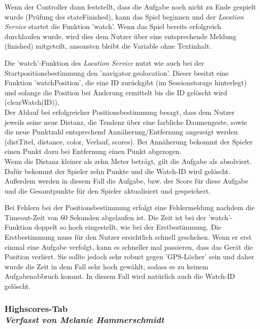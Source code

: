 Wenn der Controller dann feststellt, dass die Aufgabe noch nicht zu Ende gespielt wurde (Prüfung des stateFinished), kann das Spiel beginnen und der \emph{Location Service} startet die Funktion 'watch'. Wenn das Spiel bereits erfolgreich durchlaufen wurde, wird dies dem Nutzer über eine entsprechende Meldung (finished) mitgeteilt, ansonsten bleibt die Variable ohne Textinhalt.


Die 'watch'-Funktion des \emph{Location Service} nutzt wie auch bei der Startpositionsbestimmung den 'navigator.geolocation'. Dieser besitzt eine Funktion 'watchPosition', die eine ID zurückgibt (im Sessionstorage hinterlegt) und solange die Position bei Änderung ermittelt bis die ID gelöscht wird (clearWatch(ID)).
\\
Der Ablauf bei erfolgreicher Positionsbestimmung besagt, dass dem Nutzer jeweils seine neue Distanz, die Tendenz über eine farbliche Daumengeste, sowie die neue Punktzahl entsprechend Annäherung/Entfernung angezeigt werden (distTitel, distance, color, Verlauf, scores). Bei Annäherung bekommt der Spieler einen Punkt dazu bei Entfernung einen Punkt abgezogen.
\\
Wenn die Distanz kleiner als zehn Meter beträgt, gilt die Aufgabe als absolviert. Dafür bekommt der Spieler zehn Punkte und die Watch-ID wird gelöscht. Außerdem werden in diesem Fall die Aufgabe, bzw. der Score für diese Aufgabe und die Gesamtpunkte für den Spieler aktualisiert und gespeichert.


Bei Fehlern bei der Positionsbestimmung erfolgt eine Fehlermeldung nachdem die Timeout-Zeit von 60 Sekunden abgelaufen ist. Die Zeit ist bei der 'watch'-Funktion doppelt so hoch eingestellt, wie bei der Erstbestimmung. Die Erstbestimmung muss für den Nutzer ersichtlich schnell geschehen. Wenn er erst einmal eine Aufgabe verfolgt, kann es schneller mal passieren, dass das Gerät die Position verliert. Sie sollte jedoch sehr robust gegen 'GPS-Löcher' sein und daher wurde die Zeit in dem Fall sehr hoch gewählt, sodass es zu keinem Aufgabenabbruch kommt. In diesem Fall wird natürlich auch die Watch-ID gelöscht.
\subsubsection[Highscores-Tab]{Highscores-Tab
 \\ \textnormal{\small{\textit {Verfasst von Melanie Hammerschmidt}}}}
 
